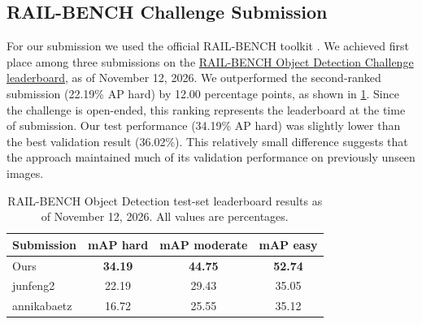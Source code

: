 \subsection{RAIL-BENCH Challenge Submission}

For our submission we used the official RAIL-BENCH toolkit \cite{railbench-object-detection-page} \cite{padilla2021comparative}. We achieved first place among three submissions on the \href{https://www.codabench.org/competitions/15442/}{RAIL-BENCH Object Detection Challenge leaderboard}, as of November 12, 2026. 
We outperformed the second-ranked submission (22.19\% AP hard) by 12.00 percentage points, as shown in \cref{tab:test_leaderboard}. Since the challenge is open-ended, this ranking represents the leaderboard at the time of submission.
Our test performance (34.19\% AP hard) was slightly lower than the best validation result (36.02\%). This relatively small difference suggests that the approach maintained much of its validation performance on previously unseen images.

\begin{table}[t]
    \centering
            \caption{RAIL-BENCH Object Detection test-set leaderboard
    results as of November 12, 2026. All values are percentages.}
    \label{tab:test_leaderboard}

    \begin{tabular}{lccc}
        \hline
        \textbf{Submission} &
        \textbf{mAP hard} &
        \textbf{mAP moderate} &
        \textbf{mAP easy} \\
        \hline
        Ours & \textbf{34.19} & \textbf{44.75} & \textbf{52.74} \\
        junfeng2 & 22.19 & 29.43 & 35.05 \\
        annikabaetz & 16.72 & 25.55 & 35.12 \\
        \hline
    \end{tabular}

\end{table}